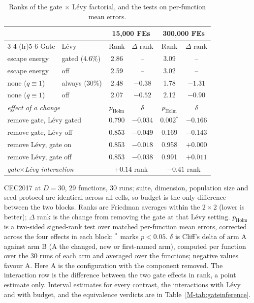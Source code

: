 \begin{table}[htbp]
\centering
\caption{Ranks of the gate $\times$ L\'evy factorial, and the tests on per-function mean errors.}
\label{tab:gatefactorial}
\begin{tabular}{llcccc}
\toprule
 & & \multicolumn{2}{c}{15{,}000 FEs} & \multicolumn{2}{c}{300{,}000 FEs} \\
\cmidrule(lr){3-4} \cmidrule(lr){5-6}
Gate & L\'evy & Rank & $\Delta$ rank & Rank & $\Delta$ rank \\
\midrule
escape energy & gated (4.6\%) & 2.86 & -- & 3.09 & -- \\
escape energy & off & 2.59 & -- & 3.02 & -- \\
none ($q\equiv1$) & always (30\%) & 2.48 & $-0.38$ & 1.78 & $-1.31$ \\
none ($q\equiv1$) & off & 2.07 & $-0.52$ & 2.12 & $-0.90$ \\
\midrule
\multicolumn{2}{l}{\emph{effect of a change}} & $p_{\text{Holm}}$ & $\delta$ & $p_{\text{Holm}}$ & $\delta$ \\
\multicolumn{2}{l}{remove gate, L\'evy gated} & 0.790 & $-0.034$ & 0.002$^{*}$ & $-0.166$ \\
\multicolumn{2}{l}{remove gate, L\'evy off} & 0.853 & $-0.049$ & 0.169 & $-0.143$ \\
\multicolumn{2}{l}{remove L\'evy, gate on} & 0.853 & $-0.018$ & 0.958 & $+0.000$ \\
\multicolumn{2}{l}{remove L\'evy, gate off} & 0.853 & $-0.038$ & 0.991 & $+0.011$ \\
\midrule
\multicolumn{2}{l}{\emph{gate}$\times$\emph{L\'evy interaction}} & \multicolumn{2}{c}{$+0.14$ rank} & \multicolumn{2}{c}{$-0.41$ rank} \\
\bottomrule
\end{tabular}
\begin{flushleft}\footnotesize
CEC2017 at $D=30$, 29 functions, 30 runs; suite, dimension, population size and seed protocol are identical across all cells, so budget is the only difference between the two blocks. Ranks are Friedman averages within the $2\times2$ (lower is better); $\Delta$ rank is the change from removing the gate at that L\'evy setting. $p_{\text{Holm}}$ is a two-sided signed-rank test over matched per-function mean errors, corrected across the four effects in each block; $^{*}$ marks $p<0.05$. $\delta$ is Cliff's delta of arm A against arm B (A the changed, new or first-named arm), computed per function over the 30 runs of each arm and averaged over the functions; negative values favour A. Here A is the configuration with the component removed. The interaction row is the difference between the two gate effects in rank, a point estimate only. Interval estimates for every contrast, the interactions with L\'evy and with budget, and the equivalence verdicts are in Table~\ref{M-tab:gateinference}.
\end{flushleft}
\end{table}
